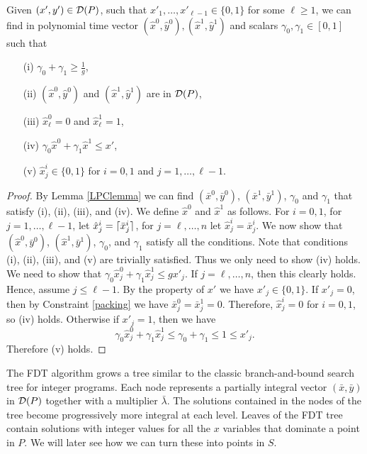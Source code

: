 \begin{lemma}\label{round-up}
	Given $(x',y')\in \operatorname{\mathcal{D}}(P)$, such that $x'_1,\ldots,x'_{\ell-1}\in \{0,1\}$ for some $\ell\geq 1$, we can find in polynomial time vector $(\hat{x}^0,\hat{y}^0),(\hat{x}^1,\hat{y}^1)$ and scalars $\gamma_0,\gamma_1 \in [0,1]$ such that
	\begin{itemize}
		\item[(i)] $\gamma_0 + \gamma_1  \geq\frac{ 1}{g}$,
		\item[(ii)] $(\hat{x}^0,\hat{y}^0)$ and $(\hat{x}^1,\hat{y}^1)$ are in  $\operatorname{\mathcal{D}}( P)$, 
		\item[(iii)] $\hat{x}^0_\ell=0$ and $\hat{x}^1_\ell=1$,
		\item[(iv)] $ \gamma_0\hat{x}^0 +\gamma_1 \hat{x}^1 \leq
		 x'$,
		 \item[(v)] $\hat{x}^i_j\in \{0,1\}$ for $i=0,1$ and $j=1,\ldots,\ell-1$.
	 	\end{itemize}
\end{lemma} 
\begin{proof}
	By Lemma \ref{LPClemma} we can find $(\bar{x}^0,\bar{y}^0)$, $(\bar{x}^1,\bar{y}^1)$, $\gamma_0$ and $\gamma_1$ that satisfy (i), (ii), (iii), and (iv). We define $\hat{x}^0$ and $\hat{x}^1$ as follows. For $i=0,1$, for $j=1,\ldots,\ell-1$, let $\hat{x}^i_j= \lceil\bar{x}^i_j\rceil$, for $j=\ell,\ldots,n$ let $\hat{x}^i_j = \bar{x}^i_j$. We now show that $(\hat{x}^0,\bar{y}^0)$, $(\hat{x}^1,\bar{y}^1)$, $\gamma_0$, and $\gamma_1$ satisfy all the conditions. Note that conditions (i), (ii), (iii), and (v) are trivially satisfied. Thus we only need to show (iv) holds. We need to show that $\gamma_0 \hat{x}^0_j+\gamma_1\hat{x}^1_j\leq gx'_j$. If $j=\ell,\ldots,n$, then this clearly holds. Hence, assume $j\leq \ell-1$. By the property of $x'$ we have $x'_j\in \{0,1\}$. If $x'_j= 0$, then by Constraint \ref{packing} we have $\bar{x}^0_j = \bar{x}^1_j=0$. Therefore, $\hat{x}^i_j=0$ for $i=0,1$, so (iv) holds. Otherwise if $x'_j = 1$, then we have
	\begin{equation*}\gamma_0\hat{x}^0_j+\gamma_1\hat{x}^1_j\leq \gamma_0+\gamma_1\leq 1\leq x'_j.\end{equation*}
Therefore (v) holds.
\end{proof}



The FDT algorithm grows a tree similar to the classic branch-and-bound search tree for integer programs. Each node represents a partially integral vector $(\bar{x},\bar{y})$ in $\operatorname{\mathcal{D}}(P)$ together with a multiplier $\bar{\lambda}$. The solutions contained in the nodes of the tree become progressively more integral at each level. Leaves of the FDT tree contain solutions with integer values for all the $x$ variables that dominate a point in $P$. We will later see how we can turn these into points in $S$. 

